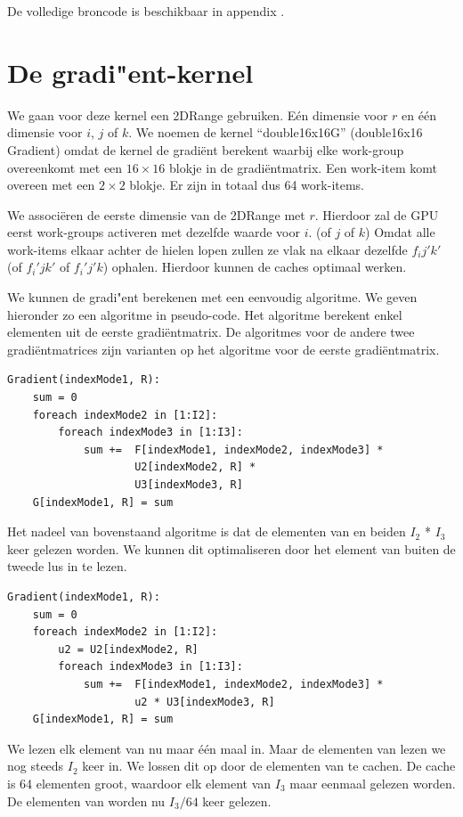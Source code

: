De volledige broncode is beschikbaar in appendix .

\section{De gradi"ent-kernel}
We gaan voor deze kernel een 2DRange gebruiken. E\'en dimensie voor $r$ en \'e\'en dimensie voor $i$, $j$ of $k$. We noemen de kernel ``double16x16G'' (double16x16 Gradient) omdat de kernel de gradi\"ent berekent waarbij elke work-group overeenkomt met een $16 \times 16$ blokje in de gradi\"entmatrix. Een work-item komt overeen met een $2 \times 2$ blokje. Er zijn in totaal dus 64 work-items.

We associ\"eren de eerste dimensie van de 2DRange met $r$. Hierdoor zal de GPU eerst work-groups activeren met dezelfde waarde voor $i$. (of $j$ of $k$) Omdat alle work-items elkaar achter de hielen lopen zullen ze vlak na elkaar dezelfde $f_ij'k'$ (of $f_i'jk'$ of $f_i'j'k$) ophalen. Hierdoor kunnen de caches optimaal werken.

We kunnen de gradi"ent berekenen met een eenvoudig algoritme. We geven hieronder zo een algoritme in pseudo-code. Het algoritme berekent enkel elementen uit de eerste gradi\"entmatrix. De algoritmes voor de andere twee gradi\"entmatrices zijn varianten op het algoritme voor de eerste gradi\"entmatrix.
\begin{lstlisting}
Gradient(indexMode1, R):
	sum = 0
	foreach indexMode2 in [1:I2]:
		foreach indexMode3 in [1:I3]:
			sum += 	F[indexMode1, indexMode2, indexMode3] *
					U2[indexMode2, R] *
					U3[indexMode3, R]
	G[indexMode1, R] = sum
\end{lstlisting}

Het nadeel van bovenstaand algoritme is dat de elementen van  en  beiden $I_2$ * $I_3$ keer gelezen worden. We kunnen dit optimaliseren door het element van  buiten de tweede lus in te lezen.

\begin{lstlisting}
Gradient(indexMode1, R):
	sum = 0
	foreach indexMode2 in [1:I2]:
		u2 = U2[indexMode2, R]
		foreach indexMode3 in [1:I3]:
			sum += 	F[indexMode1, indexMode2, indexMode3] *
					u2 * U3[indexMode3, R]
	G[indexMode1, R] = sum
\end{lstlisting}

We lezen elk element van  nu maar \'e\'en maal in. Maar de elementen van  lezen we nog steeds $I_2$ keer in.
We lossen dit op door de elementen van  te cachen. De cache is 64 elementen groot, waardoor elk element van $I_3$ maar eenmaal gelezen worden. De elementen van  worden nu $I_3/64$ keer gelezen.

